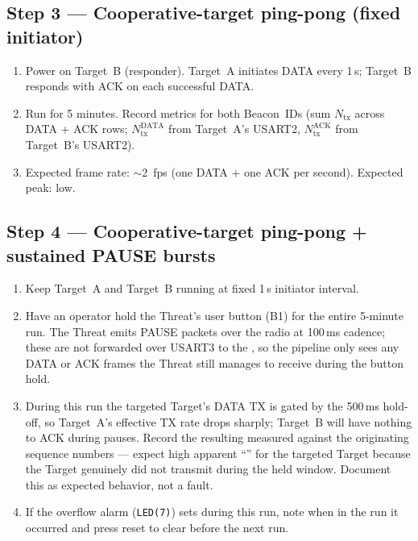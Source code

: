 \documentclass[11pt,letterpaper]{article}
\begin{document}
\subsection{Step 3 --- Cooperative-target ping-pong (fixed initiator)}
\begin{enumerate}[leftmargin=2em]
	\item Power on Target~B (responder). Target~A initiates DATA every 1\,s; Target~B responds with ACK on each successful DATA.
	\item Run for 5 minutes. Record metrics for both Beacon~IDs (sum $N_{\text{tx}}$ across DATA + ACK rows; $N_{\text{tx}}^{\text{DATA}}$ from Target~A's USART2, $N_{\text{tx}}^{\text{ACK}}$ from Target~B's USART2).
	\item Expected frame rate: $\sim$2~fps (one DATA + one ACK per second). Expected \FIFO{} peak: low.
\end{enumerate}

\subsection{Step 4 --- Cooperative-target ping-pong + sustained PAUSE bursts}
\begin{enumerate}[leftmargin=2em]
	\item Keep Target~A and Target~B running at fixed 1\,s initiator interval.
	\item Have an operator hold the Threat's user button (B1) for the entire 5-minute run. The Threat emits PAUSE packets over the radio at 100\,ms cadence; these are not forwarded over USART3 to the \FPGA{}, so the \FPGA{} pipeline only sees any DATA or ACK frames the Threat still manages to receive during the button hold.
	\item During this run the targeted Target's DATA TX is gated by the 500\,ms hold-off, so Target~A's effective TX rate drops sharply; Target~B will have nothing to ACK during pauses. Record the resulting \PER{} measured against the originating sequence numbers --- expect high apparent ``\PER{}'' for the targeted Target because the Target genuinely did not transmit during the held window. Document this as expected behavior, not a fault.
	\item If the overflow alarm (\texttt{LED(7)}) sets during this run, note when in the run it occurred and press reset to clear before the next run.
\end{enumerate}
\end{document}
